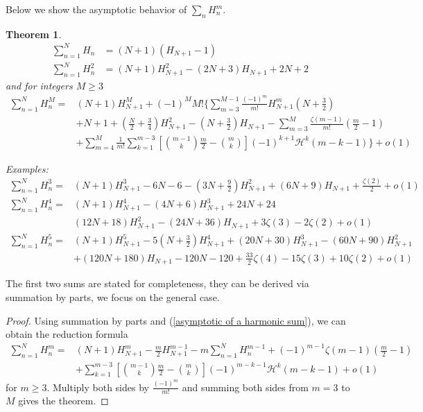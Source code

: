 \documentclass{article}
\newtheorem{theorem}{Theorem}
\begin{document}
Below we show the asymptotic behavior of $\sum_n H^m_n$.
\begin{theorem}\label{Asymptotic of sums of Harmonic powers}
    \begin{equation}\begin{split}
    \sum_{n=1}^{N}H_n& = (N+1)(H_{N+1}-1) \\ 
    \sum_{n=1}^{N}H_n^2& = (N+1)H^2_{N+1}-(2N+3)H_{N+1}+2N+2
    \end{split}\end{equation}
and for integers $M\geq 3$
\begin{equation}\label{asymptotic of sum of power harmonic number}\begin{split}
\sum_{n=1}^NH_n^M= & (N+1)H_{N+1}^M+(-1)^M M!\Bigg\{\sum_{m=3}^{M-1}\frac{(-1)^m}{m!}H_{N+1}^m\left(N+\frac{3}{2}\right)\\  &+N+1+\left(\frac{N}{2}+\frac{3}{4}\right)H_{N+1}^2- \left(N+\frac{3}{2}\right)H_{N+1}-\sum_{m=3}^M\frac{\zeta(m-1)}{m!}\left(\frac{m}{2}-1\right) \\ & +\sum_{m=4}^{M} \frac{1}{m!}\sum_{k=1}^{m-3}\left[\binom{m-1}{k}\frac{m}{2}-\binom{m}{k}\right](-1)^{k+1}\mathcal{H}^k (m-k-1)\Bigg\}+o(1)
\end{split}
\end{equation}

\textit{Examples:}
\begin{equation}\begin{split}
    \sum_{n=1}^N H_n^3 = &  (N+1) H_{N+1}^3-6N-6-\left(3N+\frac{9}{2}\right)H_{N+1}^2+ (6N+9)H_{N+1}+\frac{\zeta(2)}{2}+o(1) \\
    \sum_{n=1}^N H_n^4  = &  (N+1)H_{N+1}^4 -(4N+6)H_{N+1}^3 +24N+24  \\ & (12N+18)H_{N+1}^2 -(24N+36)H_{N+1}+3\zeta(3)-2\zeta(2)+o(1) \\ 
    \sum_{n=1}^N H_{n}^5 = & (N+1)H_{N+1}^5 -5\left(N+\frac{3}{2}\right)H_{N+1}^4+(20N+30)H_{N+1}^3-(60N+90)H_{N+1}^2 \\ &+(120N+180)H_{N+1}-120N-120+\frac{33}{2}\zeta(4)-15\zeta(3)+10\zeta(2)+o(1)
    \end{split}
\end{equation}
\end{theorem}
 The first two sums are stated for completeness, they can be derived via summation by parts, we focus on the general case.
\begin{proof}
    Using summation by parts and (\ref{asymptotic of a harmonic sum}), we can obtain the reduction formula
\begin{equation}\label{raw asymptotic power harmonic at 0}\begin{split}
    \sum_{n=1}^N H_n^m= & (N+1)H_{N+1}^m-\frac{m}{2}H_{N+1}^{m-1}-m\sum_{n=1}^N H_n^{m-1} + (-1)^{m-1}\zeta(m-1)\left(\frac{m}{2}-1\right) \\ &+\sum_{k=1}^{m-3}\left[\binom{m-1}{k}\frac{m}{2}-\binom{m}{k}\right](-1)^{m-k-1}\mathcal{H}^k(m-k-1)+o(1)
\end{split}\end{equation}
for $m\geq 3$. Multiply both sides by $\frac{(-1)^m}{m!}$ and summing both sides from $m=3$ to $M$ gives the theorem.
\end{proof}
\end{document}
